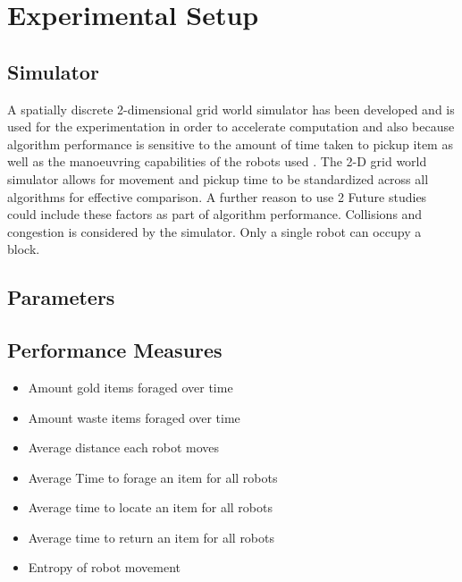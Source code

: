
\chapter{Experimental Setup}
\label{chap:third}



\section{Simulator}
A spatially discrete 2-dimensional grid world simulator has been developed and is used for the experimentation in order to accelerate computation \cite{sugawara2002swarming} and also because algorithm performance is sensitive to the amount of time taken to pickup item as well as the manoeuvring capabilities of the robots used \cite{ostergaard2001emergent}. The 2-D grid world simulator allows for movement and pickup time to be standardized across all algorithms for effective comparison. A further reason to use 2 Future studies could include these factors as part of algorithm performance. Collisions and congestion is considered by the simulator. Only a single robot can occupy a block. 

\section{Parameters}
\label{parameters}

\section{Performance Measures}
\label{thri:third:performancemeasures}

	\begin{itemize}
		\item	Amount gold items foraged over time
		\item	Amount waste items foraged over time
		\item	Average distance each robot moves
		\item	Average Time to forage an item for all robots
		\item	Average time to locate an item for all robots
		\item	Average time to return an item for all robots
		\item	Entropy of robot movement
	\end{itemize}
	
